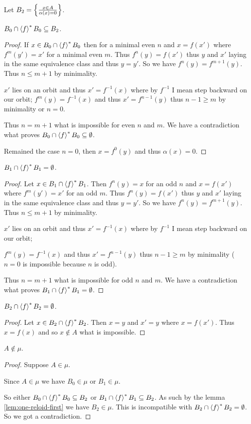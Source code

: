 Let $B_{2}=\left\{ \frac{x\in A}{\alpha(x)=0}\right\}$.
\begin{lem}
$B_{0}\cap\left\langle f\right\rangle ^{\ast}B_{0}\subseteq B_{2}$.\end{lem}
\begin{proof}
If $x\in B_{0}\cap\left\langle f\right\rangle ^{\ast}B_{0}$ then for a minimal even $n$ and
$x=f(x')$ where $f^{m}(y')=x'$ for a minimal even $m$. Thus $f^{n}(y)=f(x')$
thus $y$ and $x'$ laying in the same equivalence class and thus
$y=y'$. So we have $f^{n}(y)=f^{m+1}(y)$. Thus $n\le m+1$ by minimality.

$x'$ lies on an orbit and thus $x'=f^{-1}(x)$ where by $f^{-1}$
I mean step backward on our orbit; $f^{m}(y)=f^{-1}(x)$ and thus
$x'=f^{n-1}(y)$ thus $n-1\ge m$ by minimality or $n=0$.

Thus $n=m+1$ what is impossible for even $n$ and $m$. We have a
contradiction what proves $B_{0}\cap\left\langle f\right\rangle ^{\ast}B_{0}\subseteq\emptyset$.

Remained the case $n=0$, then $x=f^{0}(y)$ and thus $\alpha(x)=0$.\end{proof}
\begin{lem}
$B_{1}\cap\left\langle f\right\rangle ^{\ast}B_{1}=\emptyset$.\end{lem}
\begin{proof}
Let $x\in B_{1}\cap\left\langle f\right\rangle ^{\ast}B_{1}$. Then $f^{n}(y)=x$ for an odd
$n$ and $x=f(x')$ where $f^{m}(y')=x'$ for an odd $m$. Thus $f^{n}(y)=f(x')$
thus $y$ and $x'$ laying in the same equivalence class and thus
$y=y'$. So we have $f^{n}(y)=f^{m+1}(y)$. Thus $n\le m+1$ by minimality.

$x'$ lies on an orbit and thus $x'=f^{-1}(x)$ where by $f^{-1}$
I mean step backward on our orbit;

$f^{m}(y)=f^{-1}(x)$ and thus $x'=f^{n-1}(y)$ thus $n-1\ge m$ by
minimality ($n=0$ is impossible because $n$ is odd).

Thus $n=m+1$ what is impossible for odd $n$ and $m$. We have a
contradiction what proves $B_{1}\cap\left\langle f\right\rangle ^{\ast}B_{1}=\emptyset$.\end{proof}
\begin{lem}
$B_{2}\cap\left\langle f\right\rangle ^{\ast}B_{2}=\emptyset$.\end{lem}
\begin{proof}
Let $x\in B_{2}\cap\left\langle f\right\rangle ^{\ast}B_{2}$. Then $x=y$ and $x'=y$ where
$x=f(x')$. Thus $x=f(x)$ and so $x\notin A$ what is impossible.\end{proof}
\begin{lem}
$A\notin\mu$.\end{lem}
\begin{proof}
Suppose $A\in\mu$.

Since $A\in\mu$ we have $B_{0}\in\mu$ or $B_{1}\in\mu$.

So either $B_{0}\cap\left\langle f\right\rangle ^{\ast}B_{0}\subseteq B_{2}$ or $B_{1}\cap\left\langle f\right\rangle ^{\ast}B_{1}\subseteq B_{2}$.
As such by the lemma \ref{lem:one-reloid-first} we have $B_{2}\in\mu$.
This is incompatible with $B_{2}\cap\left\langle f\right\rangle ^{\ast}B_{2}=\emptyset$. So
we got a contradiction.
\end{proof}
